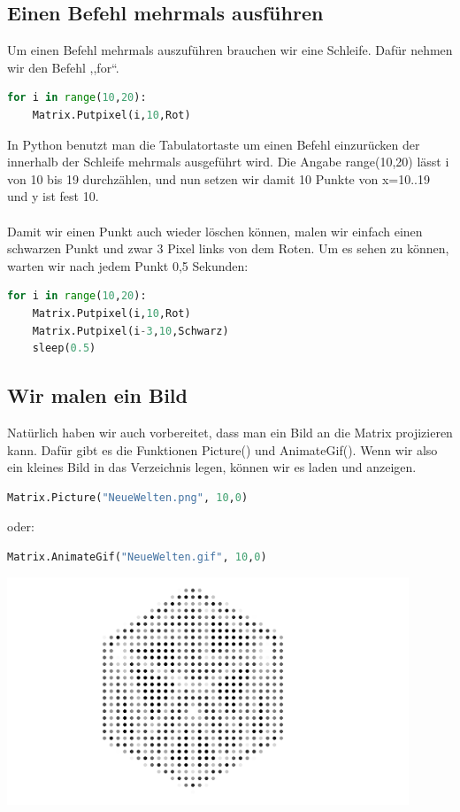 \subsection{\large{Einen Befehl mehrmals ausführen}}
Um einen Befehl mehrmals auszuführen brauchen wir eine Schleife. Dafür nehmen wir den Befehl ,,for``.
\begin{lstlisting}[language=Python, caption=For Schleifen]
for i in range(10,20):
	Matrix.Putpixel(i,10,Rot)
\end{lstlisting}
In Python benutzt man die Tabulatortaste um einen Befehl einzurücken der innerhalb der Schleife mehrmals ausgeführt wird. Die Angabe range(10,20) lässt i von 10 bis 19 durchzählen, und nun setzen wir damit 10 Punkte von x=10..19 und y ist fest 10. \\
\ \\
Damit wir einen Punkt auch wieder löschen können, malen wir einfach einen schwarzen Punkt und zwar 3 Pixel links von dem Roten. Um es sehen zu können, warten wir nach jedem Punkt 0,5 Sekunden:
\begin{lstlisting}[language=Python, caption=For Schleifen]
for i in range(10,20):
	Matrix.Putpixel(i,10,Rot)
	Matrix.Putpixel(i-3,10,Schwarz)
	sleep(0.5)
\end{lstlisting}

\subsection{\large{Wir malen ein Bild}}
Natürlich haben wir auch vorbereitet, dass man ein Bild an die Matrix projizieren kann. Dafür gibt es die Funktionen Picture() und AnimateGif(). Wenn wir also ein kleines Bild in das Verzeichnis legen, können wir es laden und anzeigen.
\begin{lstlisting}[language=Python, caption=Ein Bild]
Matrix.Picture("NeueWelten.png", 10,0)
\end{lstlisting}
oder:
\begin{lstlisting}[language=Python, caption=Ein Animiertes Gif]
Matrix.AnimateGif("NeueWelten.gif", 10,0)
\end{lstlisting}
\begin{minipage}[t]{\textwidth}
  \centering
  \includegraphics[width=0.9\textwidth]{pictures/NW.png}
  \label{img:NW}
\end{minipage}
